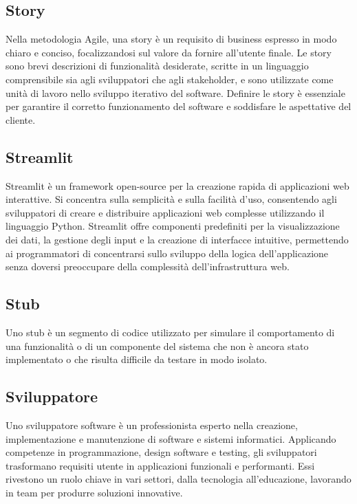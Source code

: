 \vspace{2em}
\subsection*{Story}
\par Nella metodologia Agile, una story è un requisito di business espresso in modo chiaro e conciso, focalizzandosi sul valore da fornire all'utente finale. Le story sono brevi descrizioni di funzionalità desiderate, scritte in un linguaggio comprensibile sia agli sviluppatori che agli stakeholder, e sono utilizzate come unità di lavoro nello sviluppo iterativo del software. Definire le story è essenziale per garantire il corretto funzionamento del software e soddisfare le aspettative del cliente.

\vspace{2em}
\subsection*{Streamlit}
\par Streamlit è un framework open-source per la creazione rapida di applicazioni web interattive. Si concentra sulla semplicità e sulla facilità d'uso, consentendo agli sviluppatori di creare e distribuire applicazioni web complesse utilizzando il linguaggio Python. Streamlit offre componenti predefiniti per la visualizzazione dei dati, la gestione degli input e la creazione di interfacce intuitive, permettendo ai programmatori di concentrarsi sullo sviluppo della logica dell'applicazione senza doversi preoccupare della complessità dell'infrastruttura web.

\vspace{2em}
\subsection*{Stub}
\par Uno stub è un segmento di codice utilizzato per simulare il comportamento di una funzionalità o di un componente del sistema che non è ancora stato implementato o che risulta difficile da testare in modo isolato.

\vspace{2em}
\subsection*{Sviluppatore}
\par Uno sviluppatore software è un professionista esperto nella creazione, implementazione e manutenzione di software e sistemi informatici. Applicando competenze in programmazione, design software e testing, gli sviluppatori trasformano requisiti utente in applicazioni funzionali e performanti. Essi rivestono un ruolo chiave in vari settori, dalla tecnologia all'educazione, lavorando in team per produrre soluzioni innovative.
